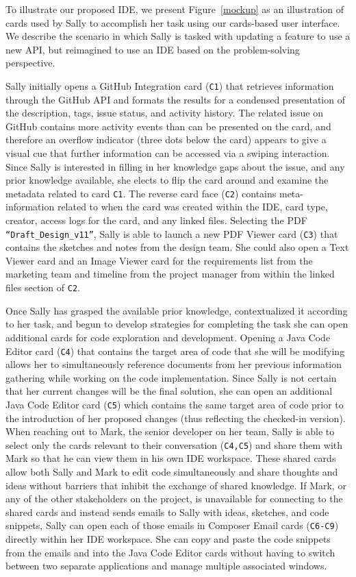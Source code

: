 \documentclass{ppig}
\begin{document}
To illustrate our proposed IDE, we present Figure~\ref{mockup} as an illustration of cards used by Sally to accomplish her task using our cards-based user interface.
We describe the scenario in which Sally is tasked with updating a feature to use a new API, but reimagined to use an IDE based on the problem-solving perspective.

Sally initially opens a GitHub Integration card (\texttt{C1}) that retrieves information through the GitHub API and formats the results for a condensed presentation of the description, tags, issue status, and activity history.
The related issue on GitHub contains more activity events than can be presented on the card, and therefore an overflow indicator (three dots below the card) appears to give a visual cue that further information can be accessed via a swiping interaction.
Since Sally is interested in filling in her knowledge gaps about the issue, and any prior knowledge available, she elects to flip the card around and examine the metadata related to card \texttt{C1}.
The reverse card face (\texttt{C2}) contains meta-information related to when the card was created within the IDE, card type, creator, access logs for the card, and any linked files.
Selecting the PDF \texttt{``Draft\_Design\_v11''}, Sally is able to launch a new PDF Viewer card (\texttt{C3}) that contains the sketches and notes from the design team.
She could also open a Text Viewer card and an Image Viewer card for the requirements list from the marketing team and timeline from the project manager from within the linked files section of \texttt{C2}.

Once Sally has grasped the available prior knowledge, contextualized it according to her task, and begun to develop strategies for completing the task she can open additional cards for code exploration and development.
Opening a Java Code Editor card (\texttt{C4}) that contains the target area of code that she will be modifying allows her to simultaneously reference documents from her previous information gathering while working on the code implementation.
Since Sally is not certain that her current changes will be the final solution, she can open an additional Java Code Editor card (\texttt{C5}) which contains the same target area of code prior to the introduction of her proposed changes (thus reflecting the checked-in version).
When reaching out to Mark, the senior developer on her team, Sally is able to select only the cards relevant to their conversation (\texttt{C4,C5}) and share them with Mark so that he can view them in his own IDE workspace.
These shared cards allow both Sally and Mark to edit code simultaneously and share thoughts and ideas without barriers that inhibit the exchange of shared knowledge.
If Mark, or any of the other stakeholders on the project, is unavailable for connecting to the shared cards and instead sends emails to Sally with ideas, sketches, and code snippets, Sally can open each of those emails in Composer Email cards (\texttt{C6-C9}) directly within her IDE workspace.
She can copy and paste the code snippets from the emails and into the Java Code Editor cards without having to switch between two separate applications and manage multiple associated windows.
\end{document}

